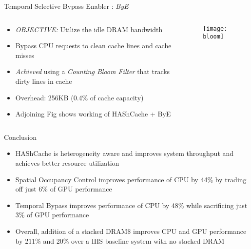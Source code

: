 \documentclass[final,t]{beamer}
\newcommand*\circled[1]{\tikz[baseline=(char.base)]{
            \node[shape=circle,draw,inner sep=2pt] (char) {#1};}}
\begin{document}
\begin{frame}[t,fragile]{}
\begin{columns}[t]
\begin{column}{.47\linewidth}
    \begin{exampleblock}{\circled{3} Temporal Selective Bypass Enabler : \textit{ByE}}
    	\begin{columns} [T]
    		\begin{column}{0.6\linewidth}
    	    \begin{itemize}
    	    	\item \emph{OBJECTIVE:} Utilize the idle DRAM bandwidth
    	    	\item Bypass CPU requests to clean cache lines and cache misses
    	    	\item \emph{Achieved} using a \textit{Counting Bloom Filter} that tracks dirty lines in cache
    	    	\item Overhead: 256KB (0.4\% of cache capacity)
			    \item Adjoining Fig shows working of HAShCache + ByE
    	    \end{itemize}     			
    		\end{column}
    		\begin{column}{0.4\linewidth}
    			\begin{figure}
					\centering
    			    \texttt{[image: bloom]}
    			\end{figure}
    	    \end{column}
    	\end{columns}
	\end{exampleblock}       
\begin{exampleblock}{Conclusion}
\vspace{-0.1em}
\begin{itemize}
\item HAShCache is heterogeneity aware and improves system throughput and achieves better resource utilization
\item Spatial Occupancy Control improves performance of CPU by 44\% by trading off just 6\% of GPU performance
\item Temporal Bypass improves performance of CPU by 48\% while sacrificing just 3\% of GPU performance 
\item Overall, addition of a stacked DRAM\$ improves CPU and GPU performance by 211\% and 20\% over a IHS baseline system with no stacked DRAM
\end{itemize}

\end{exampleblock}
\end{column}


\end{columns}
\end{frame}
\end{document}
